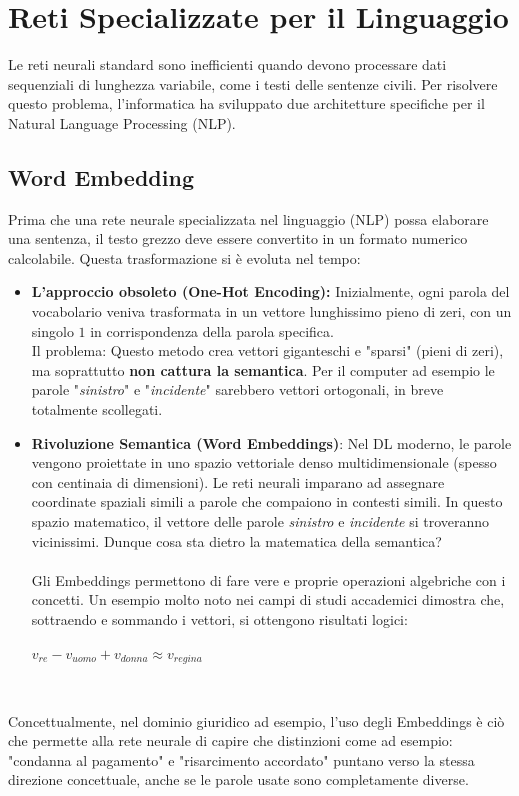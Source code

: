 \documentclass{article}
\begin{document}
\section{Reti Specializzate per il Linguaggio}
Le reti neurali standard sono inefficienti quando devono processare dati sequenziali di lunghezza variabile, come i testi delle sentenze civili. Per risolvere questo problema, l'informatica ha sviluppato due architetture specifiche per il Natural Language Processing (NLP).

\subsection{Word Embedding}
Prima che una rete neurale specializzata nel linguaggio (NLP) possa elaborare una sentenza, il testo grezzo deve essere convertito in un formato numerico calcolabile. Questa trasformazione si è evoluta nel tempo: 
\begin{itemize}
    \item \textbf{L'approccio obsoleto (One-Hot Encoding):} Inizialmente, ogni parola del vocabolario veniva trasformata in un vettore lunghissimo pieno di zeri, con un singolo $1$ in corrispondenza della parola specifica. 
    \\
    Il problema: Questo metodo crea vettori giganteschi e "sparsi" (pieni di zeri), ma soprattutto \textbf{non cattura la semantica}. Per il computer ad esempio le parole "\textit{sinistro}" e "\textit{incidente}" sarebbero vettori ortogonali, in breve totalmente scollegati.

    \item \textbf{Rivoluzione Semantica (Word Embeddings)}: Nel DL moderno, le parole vengono proiettate in uno spazio vettoriale denso multidimensionale (spesso con centinaia di dimensioni). Le reti neurali imparano ad assegnare coordinate spaziali simili a parole che compaiono in contesti simili. In questo spazio matematico, il vettore delle parole \textit{sinistro} e \textit{incidente} si troveranno vicinissimi. Dunque cosa sta dietro la matematica della semantica?\\
    \\
    Gli Embeddings permettono di fare vere e proprie operazioni algebriche con i concetti. Un esempio molto noto nei campi di studi accademici dimostra che, sottraendo e sommando i vettori, si ottengono risultati logici:
    \\
    \centerline{$v_{re} - v_{uomo} + v_{donna} \approx v_{regina}$}
    \\
   
\end{itemize}
 Concettualmente, nel dominio giuridico ad esempio, l'uso degli Embeddings è ciò che permette alla rete neurale di capire che distinzioni come ad esempio: "condanna al pagamento" e "risarcimento accordato" puntano verso la stessa direzione concettuale, anche se le parole usate sono completamente diverse.
\end{document}
